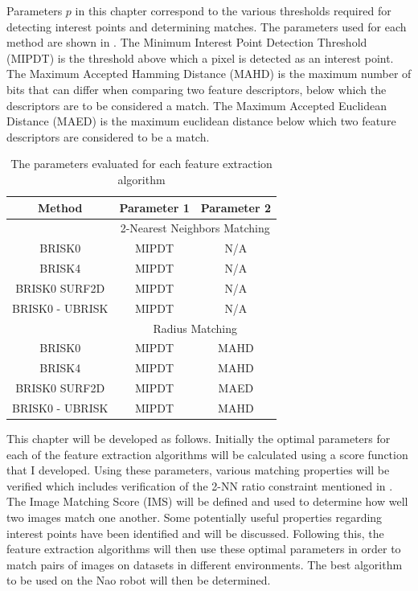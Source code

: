 Parameters $p$ in this chapter correspond to the various thresholds required for detecting interest points and determining matches. The parameters used for each method are shown in . The Minimum Interest Point Detection Threshold (MIPDT) is the threshold above which a pixel is detected as an interest point. The Maximum Accepted Hamming Distance (MAHD) is the maximum number of bits that can differ when comparing two feature descriptors, below which the descriptors are to be considered a match. The Maximum Accepted Euclidean Distance (MAED) is the maximum euclidean distance below which two feature descriptors are considered to be a match.\\

\begin{table}
\centering
\caption{The parameters evaluated for each feature extraction algorithm}
\begin{tabular}{|c|c|c|}
\hline 
Method & Parameter 1 & Parameter 2\tabularnewline
\hline 
 & \multicolumn{2}{c|}{2-Nearest Neighbors Matching}\tabularnewline
\hline 
BRISK0 & MIPDT & N/A\tabularnewline
\hline 
BRISK4 & MIPDT & N/A\tabularnewline
\hline 
BRISK0 SURF2D & MIPDT & N/A\tabularnewline
\hline 
BRISK0 - UBRISK & MIPDT & N/A\tabularnewline
\hline 
 & \multicolumn{2}{c|}{Radius Matching}\tabularnewline
\hline 
BRISK0 & MIPDT & MAHD\tabularnewline
\hline 
BRISK4 & MIPDT & MAHD\tabularnewline
\hline 
BRISK0 SURF2D & MIPDT & MAED\tabularnewline
\hline 
BRISK0 - UBRISK & MIPDT & MAHD\tabularnewline
\hline 
\end{tabular}
\label{tab:parameters}
\end{table}

This chapter will be developed as follows. Initially the optimal parameters for each of the feature extraction algorithms will be calculated using a score function that I developed. Using these parameters, various matching properties will be verified which includes verification of the 2-NN ratio constraint mentioned in . The Image Matching Score (IMS) will be defined and used to determine how well two images match one another. Some potentially useful properties regarding interest points have been identified and will be discussed. Following this, the feature extraction algorithms will then use these optimal parameters in order to match pairs of images on datasets in different environments. The best algorithm to be used on the Nao robot will then be determined.\\   


